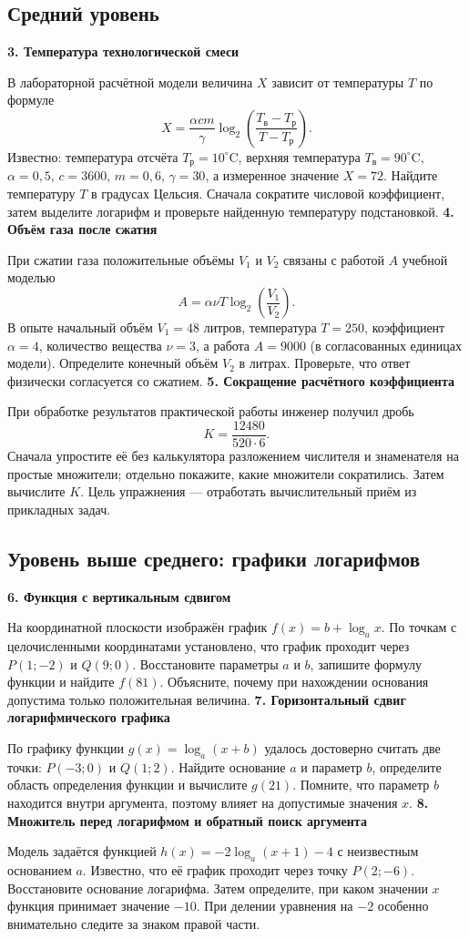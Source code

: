 \documentclass[a4paper,12pt]{article}
\newcommand{\task}[2]{\needspace{7\baselineskip}\medskip\textbf{#1. #2}\par}
\begin{document}
\subsection*{Средний уровень}
\task{3}{Температура технологической смеси}
В лабораторной расчётной модели величина $X$ зависит от температуры $T$ по формуле
\[
X=\frac{\alpha c m}{\gamma}\log_2\!\left(\frac{T_{\mathrm{в}}-T_{\mathrm{р}}}{T-T_{\mathrm{р}}}\right).
\]
Известно: температура отсчёта $T_{\mathrm{р}}=10^\circ\mathrm{C}$, верхняя температура $T_{\mathrm{в}}=90^\circ\mathrm{C}$, $\alpha=0{,}5$, $c=3600$, $m=0{,}6$, $\gamma=30$, а измеренное значение $X=72$. Найдите температуру $T$ в градусах Цельсия. Сначала сократите числовой коэффициент, затем выделите логарифм и проверьте найденную температуру подстановкой.
\task{4}{Объём газа после сжатия}
При сжатии газа положительные объёмы $V_1$ и $V_2$ связаны с работой $A$ учебной моделью
\[
A=\alpha\nu T\log_2\!\left(\frac{V_1}{V_2}\right).
\]
В опыте начальный объём $V_1=48$ литров, температура $T=250$, коэффициент $\alpha=4$, количество вещества $\nu=3$, а работа $A=9000$ (в согласованных единицах модели). Определите конечный объём $V_2$ в литрах. Проверьте, что ответ физически согласуется со сжатием.
\task{5}{Сокращение расчётного коэффициента}
При обработке результатов практической работы инженер получил дробь
\[
K=\frac{12480}{520\cdot6}.
\]
Сначала упростите её без калькулятора разложением числителя и знаменателя на простые множители; отдельно покажите, какие множители сократились. Затем вычислите $K$. Цель упражнения --- отработать вычислительный приём из прикладных задач.
\clearpage
\subsection*{Уровень выше среднего: графики логарифмов}
\task{6}{Функция с вертикальным сдвигом}
На координатной плоскости изображён график $f(x)=b+\log_a x$. По точкам с целочисленными координатами установлено, что график проходит через $P(1;-2)$ и $Q(9;0)$. Восстановите параметры $a$ и $b$, запишите формулу функции и найдите $f(81)$. Объясните, почему при нахождении основания допустима только положительная величина.
\task{7}{Горизонтальный сдвиг логарифмического графика}
По графику функции $g(x)=\log_a(x+b)$ удалось достоверно считать две точки: $P(-3;0)$ и $Q(1;2)$. Найдите основание $a$ и параметр $b$, определите область определения функции и вычислите $g(21)$. Помните, что параметр $b$ находится внутри аргумента, поэтому влияет на допустимые значения $x$.
\task{8}{Множитель перед логарифмом и обратный поиск аргумента}
Модель задаётся функцией $h(x)=-2\log_a(x+1)-4$ с неизвестным основанием $a$. Известно, что её график проходит через точку $P(2;-6)$. Восстановите основание логарифма. Затем определите, при каком значении $x$ функция принимает значение $-10$. При делении уравнения на $-2$ особенно внимательно следите за знаком правой части.
\end{document}
